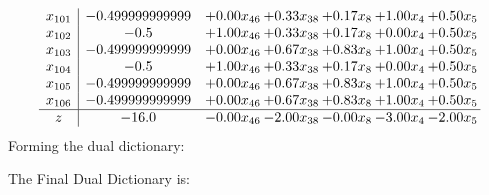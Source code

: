 \documentclass[8pt]{article}
\begin{document}
\[\begin{array}{c| c c@{\hskip 2pt} c@{\hskip 2pt} c@{\hskip 2pt} c@{\hskip 2pt} c@{\hskip 2pt} }
 x_{101}   &  -0.499999999999 & +  0.00 x_{46} & +  0.33 x_{38} & +  0.17 x_{8} & +  1.00 x_{4} & +  0.50 x_{5}\\
 x_{102}   &  -0.5 & +  1.00 x_{46} & +  0.33 x_{38} & +  0.17 x_{8} & +  0.00 x_{4} & +  0.50 x_{5}\\
 x_{103}   &  -0.499999999999 & +  0.00 x_{46} & +  0.67 x_{38} & +  0.83 x_{8} & +  1.00 x_{4} & +  0.50 x_{5}\\
 x_{104}   &  -0.5 & +  1.00 x_{46} & +  0.33 x_{38} & +  0.17 x_{8} & +  0.00 x_{4} & +  0.50 x_{5}\\
 x_{105}   &  -0.499999999999 & +  0.00 x_{46} & +  0.67 x_{38} & +  0.83 x_{8} & +  1.00 x_{4} & +  0.50 x_{5}\\
 x_{106}   &  -0.499999999999 & +  0.00 x_{46} & +  0.67 x_{38} & +  0.83 x_{8} & +  1.00 x_{4} & +  0.50 x_{5}\\
\hline
z    &  -16.0 & -0.00 x_{46} & -2.00 x_{38} & -0.00 x_{8} & -3.00 x_{4} & -2.00 x_{5}\\
\end{array}\]
Forming the dual dictionary:

The Final Dual Dictionary is: 
\end{document}
